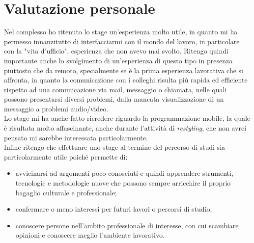 \section{Valutazione personale}

Nel complesso ho ritenuto lo stage un'esperienza molto utile, in quanto mi ha permesso innanzitutto di interfacciarmi con il mondo del lavoro, in particolare con la "vita d'ufficio", esperienza che non avevo mai svolto. Ritengo quindi importante anche lo svolgimento di un'esperienza di questo tipo in presenza piuttosto che da remoto, specialmente se è la prima esperienza lavorativa che si affronta, in quanto la comunicazione con i colleghi risulta più rapida ed efficiente rispetto ad una comunicazione via mail, messaggio o chiamata, nelle quali possono presentarsi diversi problemi, dalla mancata visualizzazione di un messaggio a problemi audio/video.\\
Lo stage mi ha anche fatto ricredere riguardo la programmazione mobile, la quale è risultata molto affascinante, anche durante l'attività di \emph{restyling}, che non avrei pensato mi sarebbe interessata particolarmente.\\
Infine ritengo che effettuare uno stage al termine del percorso di studi sia particolarmente utile poiché permette di:
\begin{itemize}
    \item avvicinarsi ad argomenti poco conosciuti e quindi apprendere strumenti, tecnologie e metodologie nuove che possono sempre arricchire il proprio bagaglio culturale e professionale;
    \item confermare o meno interessi per futuri lavori o percorsi di studio;
    \item conoscere persone nell'ambito professionale di interesse, con cui scambiare opinioni e conoscere meglio l'ambiente lavorativo.
\end{itemize}
